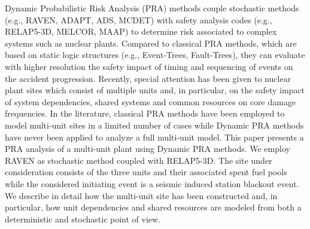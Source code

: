 Dynamic Probabilistic Risk Analysis (PRA) methods couple stochastic methods 
(e.g., RAVEN, ADAPT, ADS, MCDET) with safety analysis codes (e.g., RELAP5-3D, 
MELCOR, MAAP) to determine risk associated to complex systems such as nuclear 
plants. Compared to classical PRA methods, which are based on static logic 
structures (e.g., Event-Trees, Fault-Trees), they can evaluate with higher 
resolution the safety impact of timing and sequencing of events on the 
accident progression. 
Recently, special attention has been given to nuclear 
plant sites which consist of multiple units and, in particular, on the safety 
impact of system dependencies, shared systems and common resources on core 
damage frequencies. 
In the literature, classical PRA methods have been employed to model multi-unit 
sites in a limited number of cases while Dynamic PRA methods have never been 
applied to analyze a full multi-unit model. 
This paper presents a PRA analysis of a multi-unit plant using Dynamic PRA methods. 
We employ RAVEN as stochastic method coupled with RELAP5-3D. 
The site under consideration consists of the three units and their associated 
spent fuel pools while the considered initiating
event is a seismic induced station blackout event. We describe in detail 
how the multi-unit site has been constructed and, in particular, how unit 
dependencies and shared resources are modeled from both a deterministic and 
stochastic point of view.